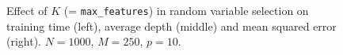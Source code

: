 \begin{figure}
\hspace{-1.75cm}
\caption{Effect of $K$ (= \texttt{max\_features}) in random variable selection on training time (left), average depth (middle) and mean squared error (right). $N=1000$, $M=250$, $p=10$.}
\label{fig:5:artificial:K}
\end{figure}

